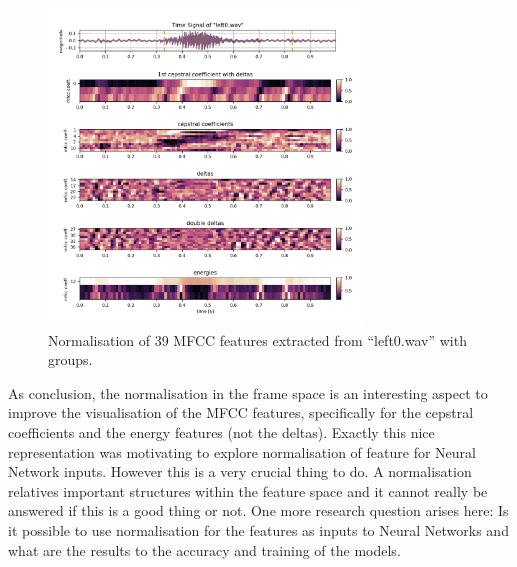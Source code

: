 \begin{figure}[!ht]
  \centering
    \includegraphics[width=0.75\textwidth]{./3_theory/figs/a3_mfcc/left0_order_norm1.png}
  \caption{Normalisation of 39 MFCC features extracted from \enquote{left0.wav} with groups.}
  \label{fig:left0_order_norm1}
\end{figure}
\FloatBarrier
\noindent
As conclusion, the normalisation in the frame space is an interesting aspect to improve the visualisation of the MFCC features, 
specifically for the cepstral coefficients and the energy features (not the deltas).
Exactly this nice representation was motivating to explore normalisation of feature for Neural Network inputs.
However this is a very crucial thing to do. A normalisation relatives important structures within the feature space and it cannot really be answered if this is a good thing or not.
One more research question arises here: Is it possible to use normalisation for the features as inputs to Neural Networks and what are the results to the accuracy and training of the models.
